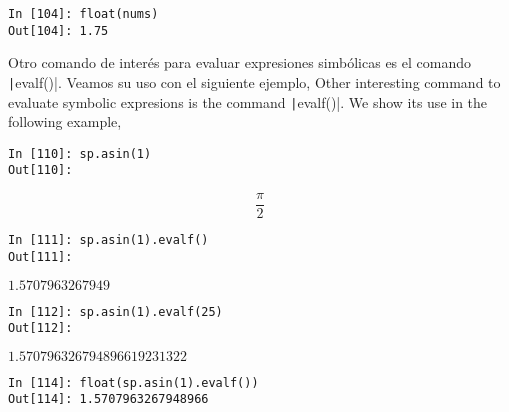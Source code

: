 \begin{center}
	\begin{minipage}{.5\textwidth}
		\begin{verbatim}
In [104]: float(nums)
Out[104]: 1.75
		\end{verbatim}
	\end{minipage}
\end{center}
\begin{paracol}{2}
Otro comando de interés para evaluar expresiones simbólicas es el comando \texttt|evalf()|. Veamos su uso con el siguiente ejemplo,
\switchcolumn
Other interesting command to evaluate symbolic expresions is the command \texttt|evalf()|. We show its use in the following example,
\end{paracol}

\begin{center}
	\begin{minipage}{.5\textwidth}
		\begin{verbatim}
In [110]: sp.asin(1)
Out[110]: 
\end{verbatim}
		\begin{equation*} \frac{\pi}{2}\end{equation*}
	\begin{verbatim}
In [111]: sp.asin(1).evalf()
Out[111]: 
\end{verbatim}
$1.5707963267949$
	\begin{verbatim}
In [112]: sp.asin(1).evalf(25)
Out[112]:
\end{verbatim}
$1.570796326794896619231322$
	\begin{verbatim}
In [114]: float(sp.asin(1).evalf())
Out[114]: 1.5707963267948966
\end{verbatim}
\end{minipage}
\end{center}
